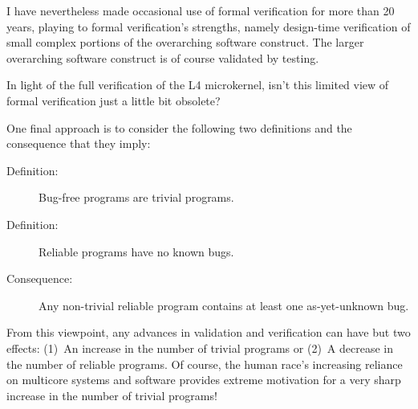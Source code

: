 I have nevertheless made occasional use of formal verification
for more than 20 years, playing to formal verification's strengths,
namely design-time verification of small complex portions of the overarching
software construct.
The larger overarching software construct is of course validated by testing.

\QuickQuiz{}
	In light of the full verification of the L4 microkernel,
	isn't this limited view of formal verification just a little
	bit obsolete?
 \QuickQuizEnd

One final approach is to consider the following two definitions and the
consequence that they imply:

\begin{description}
\item[Definition:]	Bug-free programs are trivial programs.
\item[Definition:]	Reliable programs have no known bugs.
\item[Consequence:]	Any non-trivial reliable program contains at least
			one as-yet-unknown bug.
\end{description}

From this viewpoint, any advances in validation and verification can
have but two effects: (1)~An increase in the number of trivial programs or
(2)~A decrease in the number of reliable programs.
Of course, the human race's increasing reliance on multicore systems and
software provides extreme motivation for a very sharp increase in the
number of trivial programs!

